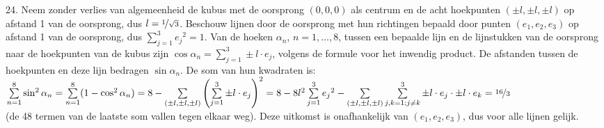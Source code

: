 \begin{problem}{24.}
	Neem zonder verlies van algemeenheid de kubus met de oor\-sprong $(0,0,0)$ als centrum en de acht hoekpunten $(\pm l,\pm l,\pm l)$ op afstand 1 van de oorsprong, dus $l = \nicefrac{1}{\sqrt{3}}$. Beschouw lijnen door de oorsprong met hun richtingen bepaald door punten $(e_1,e_2,e_3)$ op afstand 1 van de oorsprong, dus $\sum\limits_{j=1}^{3} {e_j}^2 = 1$. Van de hoeken $\alpha_n$, $n = 1,\dotsc,8$, tussen een bepaalde lijn en de lijnstukken van de oorsprong naar de hoekpunten van de kubus zijn $\cos \alpha_n = \sum\limits_{j=1}^{3} \pm l \cdot e_j$, volgens de formule voor het inwendig product. De afstanden tussen de hoek\-punten en deze lijn bedragen $\sin \alpha_n$. De som van hun kwadraten is:\\$\sum\limits_{n=1}^{8} \sin^2 \alpha_n = \sum\limits_{n=1}^{8} (1 - \cos^2 \alpha_n) = 8 - \sum\limits_{(\pm l,\pm l,\pm l)} {\left( \sum\limits_{j=1}^{3} \pm l \cdot e_j \right)}^2\\= 8 - 8 l^2 \sum\limits_{j=1}^{3} {e_j}^2 - \sum\limits_{(\pm l,\pm l,\pm l)} \sum\limits_{j,k=1;j \neq k}^{3} \pm l \cdot e_j \cdot \pm l \cdot e_k = \nicefrac{16}{3}$\\(de 48 termen van de laatste som vallen tegen elkaar weg). Deze uitkomst is onafhankelijk van $(e_1,e_2,e_3)$, dus voor alle lijnen gelijk.
\end{problem}

\clearpage

